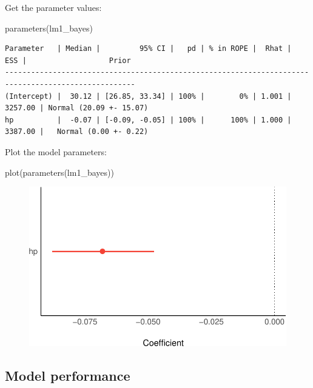 \documentclass[
  letterpaper,
  DIV=11,
  numbers=noendperiod]{scrreprt}
\newenvironment{Shaded}{\begin{snugshade}}{\end{snugshade}}
\newcommand{\FunctionTok}[1]{\textcolor[rgb]{0.28,0.35,0.67}{#1}}
\newcommand{\NormalTok}[1]{\textcolor[rgb]{0.00,0.23,0.31}{#1}}
\theoremstyle{definition}
\theoremstyle{definition}
\theoremstyle{remark}
\begin{document}
Get the parameter values:

\begin{Shaded}
\begin{Highlighting}[]
\FunctionTok{parameters}\NormalTok{(lm1\_bayes)}
\end{Highlighting}
\end{Shaded}

\begin{verbatim}
Parameter   | Median |         95% CI |   pd | % in ROPE |  Rhat |     ESS |                   Prior
----------------------------------------------------------------------------------------------------
(Intercept) |  30.12 | [26.85, 33.34] | 100% |        0% | 1.001 | 3257.00 | Normal (20.09 +- 15.07)
hp          |  -0.07 | [-0.09, -0.05] | 100% |      100% | 1.000 | 3387.00 |   Normal (0.00 +- 0.22)
\end{verbatim}

Plot the model parameters:

\begin{Shaded}
\begin{Highlighting}[]
\FunctionTok{plot}\NormalTok{(}\FunctionTok{parameters}\NormalTok{(lm1\_bayes))}
\end{Highlighting}
\end{Shaded}

\begin{figure}[H]

{\centering \includegraphics{./regression1_files/figure-pdf/unnamed-chunk-4-1.pdf}

}

\end{figure}

\hypertarget{model-performance}{%
\subsection{Model performance}\label{model-performance}}
\end{document}
